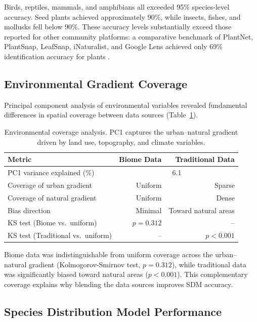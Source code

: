 \documentclass[11pt]{article}
\begin{document}
Birds, reptiles, mammals, and amphibians all exceeded 95\% species-level accuracy. Seed plants achieved approximately 90\%, while insects, fishes, and mollusks fell below 90\%. These accuracy levels substantially exceed those reported for other community platforms: a comparative benchmark of PlantNet, PlantSnap, LeafSnap, iNaturalist, and Google Lens achieved only 69\% identification accuracy for plants \citep{joly2016lifeclef}.

\subsection{Environmental Gradient Coverage}

Principal component analysis of environmental variables revealed fundamental differences in spatial coverage between data sources (Table~\ref{tab:pca}).

\begin{table}[H]
\centering
\caption{Environmental coverage analysis. PC1 captures the urban--natural gradient driven by land use, topography, and climate variables.}
\label{tab:pca}
\begin{tabular}{lrr}
\toprule
\textbf{Metric} & \textbf{Biome Data} & \textbf{Traditional Data} \\
\midrule
PC1 variance explained (\%) & \multicolumn{2}{c}{6.1} \\
Coverage of urban gradient & Uniform & Sparse \\
Coverage of natural gradient & Uniform & Dense \\
Bias direction & Minimal & Toward natural areas \\
KS test (Biome vs.\ uniform) & $p = 0.312$ & -- \\
KS test (Traditional vs.\ uniform) & -- & $p < 0.001$ \\
\bottomrule
\end{tabular}
\end{table}

Biome data was indistinguishable from uniform coverage across the urban--natural gradient (Kolmogorov-Smirnov test, $p = 0.312$), while traditional data was significantly biased toward natural areas ($p < 0.001$). This complementary coverage explains why blending the data sources improves SDM accuracy.

\subsection{Species Distribution Model Performance}
\end{document}

